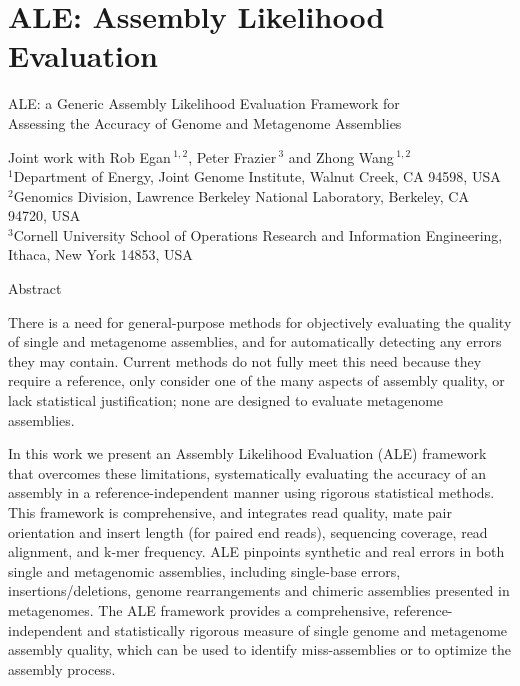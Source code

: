 \documentclass[phd,tocprelim]{cornell}
\begin{document}
\part{ALE: Assembly Likelihood Evaluation} %
\label{prt:ALE: Assembly Likelihood Evaluation}
\singlespacing

\noindent
\large
ALE: a Generic Assembly Likelihood Evaluation Framework for \\ Assessing the Accuracy of Genome and Metagenome Assemblies

\noindent
\normalsize
Joint work with Rob Egan\,$^{1,2}$, Peter Frazier\,$^{3}$ and Zhong Wang\,$^{1,2}$ \\
\scriptsize
$^{1}$Department of Energy, Joint Genome Institute, Walnut Creek, CA 94598, USA\\
$^{2}$Genomics Division, Lawrence Berkeley National Laboratory, Berkeley, CA 94720, USA\\
$^{3}$Cornell University School of Operations Research and Information Engineering, Ithaca, New York 14853, USA
\normalsize

\normalspacing

\begin{center}
   Abstract 
\end{center}

There is a need for general-purpose methods for objectively evaluating the quality of single and metagenome assemblies, and for automatically detecting any errors they may contain.  Current methods do not fully meet this need because they require a reference, only consider one of the many aspects of assembly quality, or lack statistical justification; none are designed to evaluate metagenome assemblies.

In this work we present an Assembly Likelihood Evaluation (ALE) framework that overcomes these limitations, systematically evaluating the accuracy of an assembly in a reference-independent manner using rigorous statistical methods.  This framework is comprehensive, and integrates read quality, mate pair orientation and insert length (for paired end reads), sequencing coverage, read alignment, and k-mer frequency. ALE pinpoints synthetic and real errors in both single and metagenomic assemblies, including single-base errors, insertions/deletions, genome rearrangements and chimeric assemblies presented in metagenomes.  The ALE framework provides a comprehensive, reference-independent and statistically rigorous measure of single genome and metagenome assembly quality, which can be used to identify miss-assemblies or to optimize the assembly process.
\end{document}

